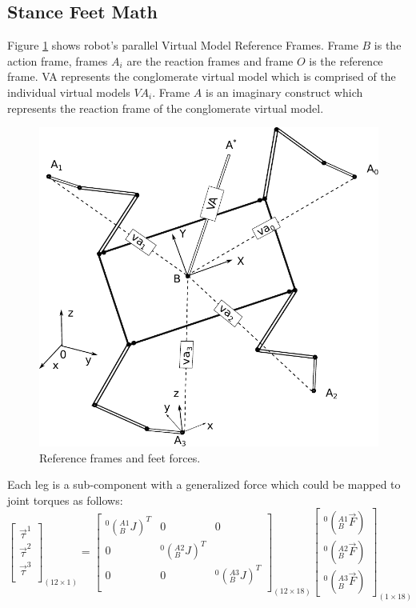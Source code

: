 \documentclass[]{article}
\begin{document}
\subsection{Stance Feet Math}
Figure \ref{fig:guaravirtualactuators} shows robot's  parallel Virtual Model Reference Frames. Frame $B$ is the action frame, frames $A_i$ 
are the reaction frames and frame $O$ is the reference frame. VA represents the conglomerate virtual model which is comprised of the individual virtual models $VA_i$. Frame $A$ is an imaginary construct which represents the reaction frame of the conglomerate virtual model.
\begin{figure}%
	\centering
	\includegraphics[scale=0.4]{"Figuras/GuaraVirtualActuators"}
	\caption{Reference frames and feet forces.}
	\label{fig:guaravirtualactuators}
\end{figure}
Each leg is a sub-component with a generalized force which could be mapped to joint torques as follows:
\begin{equation}
\begin{bmatrix}
	\vec{\tau}^1 \\
	\vec{\tau}^2 \\
	\vec{\tau}^3 \\
\end{bmatrix}_{(12\times1)}
=
\begin{bmatrix}
	^0(_B^{A1}J)^T  & 0 				& 0  				\\ 
		0  			& ^0(_B^{A2}J)^T 	&   				\\ 
		0 			& 0 				&^0(_B^{A3}J)^T 	\\ 
\end{bmatrix}_{(12 \times 18)}
\begin{bmatrix}
	^0(_B^{A1}\vec{F}) 	\\
	^0(_B^{A2}\vec{F}) 	\\
	^0(_B^{A3}\vec{F})
\end{bmatrix}_{(1 \times 18)}
\label{eq:parallelVirtualModelEquation}
\end{equation}
\end{document}
